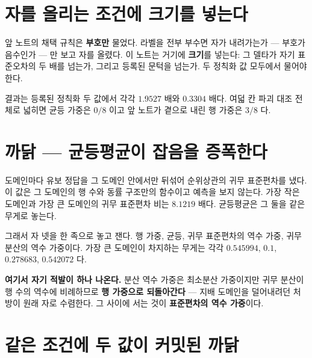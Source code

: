 \section{자를 올리는 조건에 크기를 넣는다}


앞 노트의 채택 규칙은 \textbf{부호만} 물었다. 라벨을 전부 부수면 자가 내려가는가 --- 부호가 음수인가 --- 만 보고 자를 올렸다. 이 노트는 거기에 \textbf{크기}를 넣는다: 그 델타가 자기 표준오차의 두 배를 넘는가, 그리고 등록된 문턱을 넘는가. 두 정칙화 값 모두에서 물어야 한다.

결과는 등록된 정칙화 두 값에서 각각 $1.9527$ 배와 $0.3304$ 배다. 여덟 칸 파괴 대조 전체로 넓히면 균등 가중은 $0 / 8$ 이고 앞 노트가 곁으로 내린 행 가중은 $3 / 8$ 다.

\section{까닭 --- 균등평균이 잡음을 증폭한다}


도메인마다 유보 정답을 그 도메인 안에서만 뒤섞어 순위상관의 귀무 표준편차를 냈다. 이 값은 그 도메인의 행 수와 동률 구조만의 함수이고 예측을 보지 않는다. 가장 작은 도메인과 가장 큰 도메인의 귀무 표준편차 비는 $8.1219$ 배다. 균등평균은 그 둘을 같은 무게로 놓는다.

그래서 자 넷을 한 족으로 놓고 잰다. 행 가중, 균등, 귀무 표준편차의 역수 가중, 귀무 분산의 역수 가중이다. 가장 큰 도메인이 차지하는 무게는 각각 $0.545994$, $0.1$, $0.278683$, $0.542072$ 다.

\textbf{여기서 자기 적발이 하나 나온다.} 분산 역수 가중은 최소분산 가중이지만 귀무 분산이 행 수의 역수에 비례하므로 \textbf{행 가중으로 되돌아간다} --- 지배 도메인을 덜어내려던 처방이 원래 자로 수렴한다. 그 사이에 서는 것이 \textbf{표준편차의 역수 가중}이다.

\section{같은 조건에 두 값이 커밋된 까닭}

